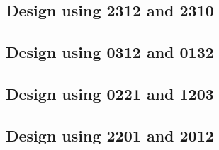 \subsection{Design using 2312 and 2310}


 \begin{center}




 \end{center}



\subsection{Design using 0312 and 0132}


 \begin{center}




 \end{center}



\subsection{Design using 0221 and 1203}


 \begin{center}




 \end{center}



\subsection{Design using 2201 and 2012}

